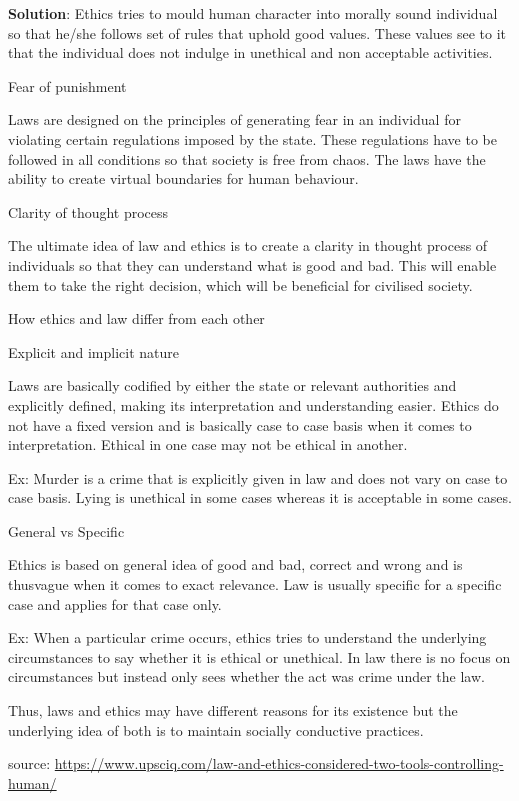 \documentclass[
  openany]{book}
\newenvironment{solution}{ {\bfseries Solution}:}{}
\begin{document}
\begin{questions}
\begin{solution}
Ethics tries to mould human character into morally sound individual so that he/she follows set of rules that uphold good values. These values see to it that the individual does not indulge in unethical and non acceptable activities.

Fear of punishment

Laws are designed on the principles of generating fear in an individual for violating certain regulations imposed by the state. These regulations have to be followed in all conditions so that society is free from chaos. The laws have the ability to create virtual boundaries for human behaviour.

Clarity of thought process

The ultimate idea of law and ethics is to create a clarity in thought process of individuals so that they can understand what is good and bad. This will enable them to take the right decision, which will be beneficial for civilised society.

How ethics and law differ from each other

Explicit and implicit nature

Laws are basically codified by either the state or relevant authorities and explicitly defined, making its interpretation and understanding easier. Ethics do not have a fixed version and is basically case to case basis when it comes to interpretation. Ethical in one case may not be ethical in another.

Ex: Murder is a crime that is explicitly given in law and does not vary on case to case basis.
    Lying is unethical in some cases whereas it is acceptable in some cases.
    
General vs Specific

Ethics is based on general idea of good and bad, correct and wrong and is thusvague when it comes to exact relevance. Law is usually specific for a specific case and applies for that case only.

Ex: When a particular crime occurs, ethics tries to understand the underlying circumstances to say whether it is ethical or unethical. In law there is no focus on circumstances but instead only sees whether the act was crime under the law.

Thus, laws and ethics may have different reasons for its existence but the underlying idea of both is to maintain socially conductive practices.

source: \url{https://www.upsciq.com/law-and-ethics-considered-two-tools-controlling-human/}
\end{solution}


\end{questions}
\end{document}

